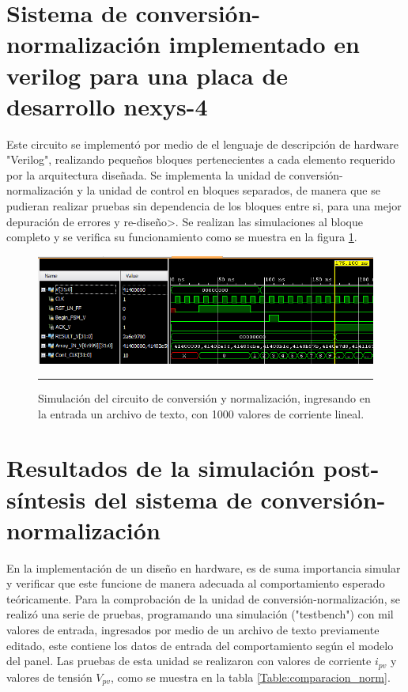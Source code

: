 \section{Sistema de conversión-normalización implementado en verilog para una placa de desarrollo nexys-4}

Este circuito se implementó por medio de el lenguaje de descripción de hardware "Verilog", realizando pequeños bloques pertenecientes a cada elemento requerido por la arquitectura diseñada. Se implementa la unidad de conversión-normalización y la unidad de control en bloques separados, de manera que se pudieran realizar pruebas sin dependencia de los bloques entre si, para una mejor depuración de errores y re-diseño>. Se realizan las simulaciones al bloque completo y se verifica su funcionamiento como se muestra en la figura \ref{fig:SIMNORM}. 

\begin{figure}[H]
  \centering
    \includegraphics[scale=0.8]{./TEST_CONV_NOM_I.png}
    \rule{35em}{0.5pt}
  \caption[Simulación del circuito de conversión y normalización, ingresando en la entrada un archivo de texto, con 1000 valores de corriente lineal]{Simulación del circuito de conversión y normalización, ingresando en la entrada un archivo de texto, con 1000 valores de corriente lineal.}
  \label{fig:SIMNORM}
\end{figure}



\section{Resultados de la simulación post-síntesis del sistema de conversión-normalización}

En la implementación de un diseño en hardware, es de suma importancia simular y verificar que este funcione de manera adecuada al comportamiento esperado teóricamente. Para la comprobación de la unidad de conversión-normalización, se realizó una serie de pruebas, programando una simulación ("testbench") con mil valores de entrada, ingresados por medio de un archivo de texto previamente editado, este contiene los datos de entrada del comportamiento según el modelo del panel. 
Las pruebas de esta unidad se realizaron con valores de corriente $ i_{pv}$ y valores de tensión $ V_{pv}$, como se muestra en la tabla \ref{Table:comparacion_norm}. 

